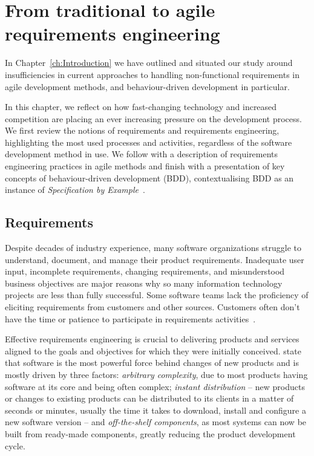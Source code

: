 \documentclass[dissertation,final]{softeng}
\begin{document}
\chapter{From traditional to agile requirements engineering}
\label{ch:Background}
In Chapter~\ref{ch:Introduction} we have outlined and situated our study around insufficiencies in current approaches to handling non-functional requirements in agile development methods, and behaviour-driven development in particular. 

In this chapter, we reflect on how fast-changing technology and increased competition are placing an ever increasing pressure on the development process. We first review the notions of requirements and requirements engineering, highlighting the most used processes and activities, regardless of the software development method in use. We follow with a description of requirements engineering practices in agile methods and finish with a presentation of key concepts of behaviour-driven development (BDD), contextualising BDD as an instance of \emph{Specification by Example}~\citep{Adzic201106}.

\section{Requirements}
\label{sec:requirements}
Despite decades of industry experience, many software organizations struggle to understand, document, and manage their product requirements. Inadequate user input, incomplete requirements, changing requirements, and misunderstood business objectives are major reasons why so many information technology projects are less than fully successful. Some software teams lack the proficiency of eliciting requirements from customers and other sources. Customers often don't have the time or patience to participate in requirements activities~\citep{Wiegers2013}. 

Effective requirements engineering is crucial to delivering products and services aligned to the goals and objectives for which they were initially conceived. \citet{Hull2011} state that software is the most powerful force behind changes of new products and is mostly driven by three factors: \emph{arbitrary complexity}, due to most products having software at its core and being often complex; \emph{instant distribution} -- new products or changes to existing products can be distributed to its clients in a matter of seconds or minutes, usually the time it takes to download, install and configure a new software version -- and \emph{off-the-shelf components}, as most systems can now be built from ready-made components, greatly reducing the product development cycle.
\end{document}
